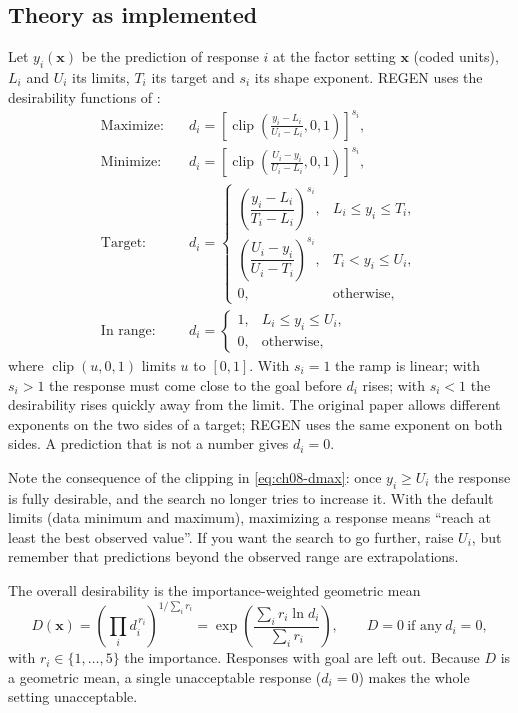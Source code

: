 \subsection{Theory as implemented}
Let $y_i(\mathbf x)$ be the prediction of response $i$ at the factor setting $\mathbf x$ (coded units), $L_i$ and
$U_i$ its limits, $T_i$ its target and $s_i$ its shape exponent. REGEN uses the desirability functions of
\citet{derringer1980}:
\begin{align}
\text{Maximize:}\quad & d_i=\left[\operatorname{clip}\!\left(\frac{y_i-L_i}{U_i-L_i},0,1\right)\right]^{s_i},
\label{eq:ch08-dmax}\\
\text{Minimize:}\quad & d_i=\left[\operatorname{clip}\!\left(\frac{U_i-y_i}{U_i-L_i},0,1\right)\right]^{s_i},
\label{eq:ch08-dmin}\\
\text{Target:}\quad & d_i=\begin{cases}
\left(\dfrac{y_i-L_i}{T_i-L_i}\right)^{s_i}, & L_i\le y_i\le T_i,\\[2ex]
\left(\dfrac{U_i-y_i}{U_i-T_i}\right)^{s_i}, & T_i< y_i\le U_i,\\[1ex]
0, & \text{otherwise,}\end{cases}
\label{eq:ch08-dtarget}\\
\text{In range:}\quad & d_i=\begin{cases}1, & L_i\le y_i\le U_i,\\ 0, & \text{otherwise,}\end{cases}
\label{eq:ch08-drange}
\end{align}
where $\operatorname{clip}(u,0,1)$ limits $u$ to $[0,1]$. With $s_i=1$ the ramp is linear; with $s_i>1$ the
response must come close to the goal before $d_i$ rises; with $s_i<1$ the desirability rises quickly away from the
limit. The original paper allows different exponents on the two sides of a target; REGEN uses the same exponent
on both sides. A prediction that is not a number gives $d_i=0$.

Note the consequence of the clipping in \eqref{eq:ch08-dmax}: once $y_i\ge U_i$ the response is fully desirable,
and the search no longer tries to increase it. With the default limits (data minimum and maximum), maximizing a
response means ``reach at least the best observed value''. If you want the search to go further, raise $U_i$, but
remember that predictions beyond the observed range are extrapolations.

The overall desirability is the importance-weighted geometric mean
\begin{equation}
D(\mathbf x)=\left(\prod_{i} d_i^{\,r_i}\right)^{1/\sum_i r_i}
=\exp\!\left(\frac{\sum_i r_i\ln d_i}{\sum_i r_i}\right),\qquad D=0\ \text{if any}\ d_i=0,
\label{eq:ch08-D}
\end{equation}
with $r_i\in\{1,\dots,5\}$ the importance. Responses with goal  are left out. Because $D$ is a geometric
mean, a single unacceptable response ($d_i=0$) makes the whole setting unacceptable.

